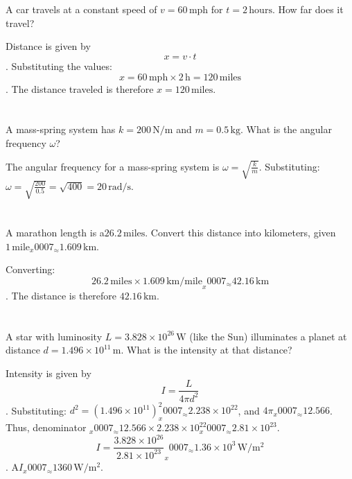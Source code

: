 \documentclass{article}
\begin{document}
\section{}
A car travels at a constant speed of \( v = 60 \, \mathrm{mph} \) for \( t = 2 \, \mathrm{hours} \). How far does it travel?

Distance is given by \[ x = v \cdot t \]. Substituting the values: \[ x = 60 \, \mathrm{mph} \times 2 \, \mathrm{h} = 120 \, \mathrm{miles} \]. The distance traveled is therefore \( x = 120 \, \mathrm{miles} \).

\section{}
A mass-spring system has \( k = 200 \, \mathrm{N/m} \) and \( m = 0.5 \, \mathrm{kg} \). What is the angular frequency \(\omega\)?

The angular frequency for a mass-spring system is \(\omega = \sqrt{\frac{k}{m}}\). Substituting: \(\omega = \sqrt{\frac{200}{0.5}} = \sqrt{400} = 20 \, \mathrm{rad/s}\).

\section{}
A marathon length is a\approximately \(26.2 \, \mathrm{miles}\). Convert this distance into kilometers, given \(1 \, \mathrm{mile} _x0007_\approx 1.609 \, \mathrm{km}\).

Converting: \[ 26.2 \, \mathrm{miles} \times 1.609 \, \mathrm{km/mile} _x0007_\approx 42.16 \, \mathrm{km} \]. The distance is therefore \( 42.16 \, \mathrm{km} \).

\section{}
A star with luminosity \( L = 3.828 \times 10^{26} \, \mathrm{W} \) (like the Sun) illuminates a planet at distance \( d = 1.496 \times 10^{11} \, \mathrm{m} \). What is the intensity at that distance?

Intensity is given by \[ I = \frac{L}{4 \pi d^2} \]. Substituting: \( d^2 = (1.496 \times 10^{11})^2 _x0007_\approx 2.238 \times 10^{22} \), and \(4\pi _x0007_\approx 12.566\). Thus, denominator \(_x0007_\approx 12.566 \times 2.238 \times 10^{22} _x0007_\approx 2.81 \times 10^{23}\). \[ I = \frac{3.828 \times 10^{26}}{2.81 \times 10^{23}} _x0007_\approx 1.36 \times 10^3 \, \mathrm{W/m^2} \]. A\approximately \( I _x0007_\approx 1360 \, \mathrm{W/m^2} \).
\end{document}
